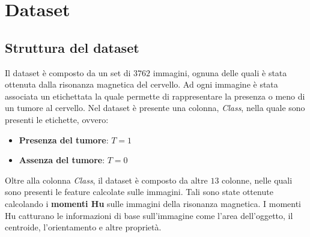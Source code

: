 \chapter{Dataset}
\section{Struttura del dataset}
Il dataset è composto da un set di $3762$ immagini, ognuna delle quali è stata
ottenuta dalla risonanza magnetica del cervello. Ad ogni immagine è stata
associata un etichettata la quale permette di rappresentare la presenza o meno
di un tumore al cervello. Nel dataset è presente una colonna, \textit{Class},
nella quale sono presenti le etichette, ovvero:
\begin{itemize}
    \item \textbf{Presenza del tumore}: $T = 1$
    \item \textbf{Assenza del tumore}: $T = 0$
\end{itemize}

Oltre alla colonna \textit{Class}, il dataset è composto da altre $13$ colonne,
nelle quali sono presenti le feature calcolate sulle immagini. Tali sono state
ottenute calcolando i \textbf{momenti Hu} sulle immagini della risonanza magnetica.
I momenti Hu catturano le informazioni di base sull'immagine come l'area
dell'oggetto, il centroide, l'orientamento e altre proprietà.

